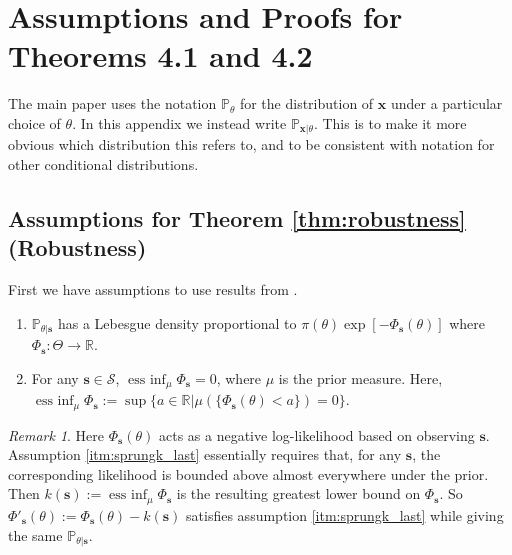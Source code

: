 \documentclass{article}
\theoremstyle{plain}
\theoremstyle{definition}
\theoremstyle{remark}
\newtheorem{remark}[theorem]{Remark}
\DeclareMathOperator{\essinf}{ess\ inf}
\begin{document}





\newpage
\appendix
\onecolumn

\section{Assumptions and Proofs for Theorems 4.1 and 4.2} \label{app:proofs}

The main paper uses the notation $\mathbb{P}_{\theta}$ for the distribution of $\mathbf{x}$
under a particular choice of $\theta$.
In this appendix we instead write $\mathbb{P}_{\mathbf{x}|\theta}$.
This is to make it more obvious which distribution this refers to,
and to be consistent with notation for other conditional distributions.

\subsection{Assumptions for Theorem \ref{thm:robustness} (Robustness)} \label{app:robustness assumptions}

First we have assumptions to use results from \citet{sprungkLocalLipschitzStability2020a}.
\begin{enumerate}
  \item \label{itm:sprungk_first}
  $\mathbb{P}_{\theta|\mathbf{s}}$ has a Lebesgue density proportional to $\pi(\theta) \exp[-\Phi_\mathbf{s}(\theta)]$
  where $\Phi_\mathbf{s}: \Theta \to \mathbb{R}$.
  \item \label{itm:sprungk_last}
  For any $\mathbf{s} \in \mathcal{S}$,
  $\essinf_\mu \Phi_{\mathbf{s}} = 0$,
  where $\mu$ is the prior measure.
  Here, $\essinf_\mu \Phi_{\mathbf{s}} := \sup \{ a \in \mathbb{R} \vert \mu( \{ \Phi_{\mathbf{s}}(\theta) < a \} ) = 0 \}$.
\end{enumerate}
\begin{remark}
Here $\Phi_\mathbf{s}(\theta)$ acts as a negative log-likelihood based on observing $\mathbf{s}$.
Assumption \ref{itm:sprungk_last} essentially requires that, for any $\mathbf{s}$,
the corresponding likelihood is bounded above almost everywhere under the prior.
Then $k(\mathbf{s}) := \essinf_\mu \Phi_{\mathbf{s}}$ is
the resulting greatest lower bound on $\Phi_{\mathbf{s}}$.
So $\Phi'_{\mathbf{s}}(\theta) := \Phi_{\mathbf{s}}(\theta) - k(\mathbf{s})$
satisfies assumption \ref{itm:sprungk_last}
while giving the same $\mathbb{P}_{\theta|\mathbf{s}}$.
\end{remark}
\end{document}
